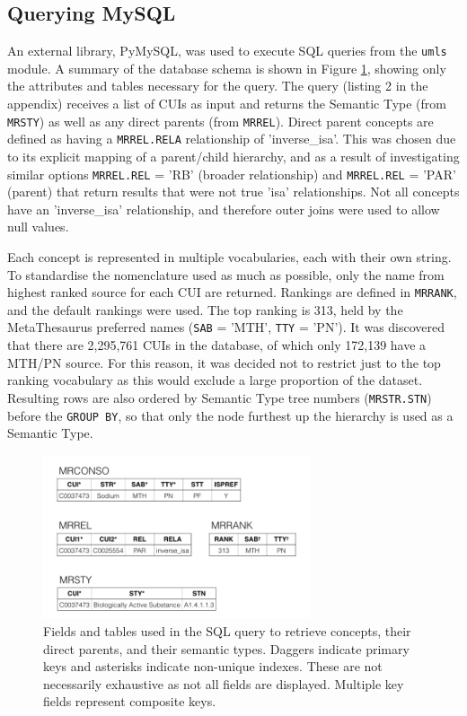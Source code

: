 \documentclass[Report.tex]{subfiles}
\begin{document}
\subsection{Querying MySQL}
An external library, PyMySQL, was used to execute SQL queries from the \texttt{umls} module. A summary of the database schema is shown in Figure \ref{fig:db}, showing only the attributes and tables necessary for the query. The query (listing 2 in the appendix) receives a list of CUIs as input and returns the Semantic Type (from \texttt{MRSTY}) as well as any direct parents (from \texttt{MRREL}). Direct parent concepts are defined as having a \texttt{MRREL.RELA} relationship of 'inverse\_isa'. This was chosen due to its explicit mapping of a parent/child hierarchy, and as a result of investigating similar options \texttt{MRREL.REL} = 'RB' (broader relationship) and \texttt{MRREL.REL} = 'PAR' (parent) that return results that were not true 'isa' relationships. Not all concepts have an 'inverse\_isa' relationship, and therefore outer joins were used to allow null values.\newline

\noindent Each concept is represented in multiple vocabularies, each with their own string. To standardise the nomenclature used as much as possible, only the name from highest ranked source for each CUI are returned. Rankings are defined in \texttt{MRRANK}, and the default rankings were used. The top ranking is 313, held by the MetaThesaurus preferred names (\texttt{SAB} = 'MTH', \texttt{TTY} = 'PN'). It was discovered that there are 2,295,761 CUIs in the database, of which only 172,139 have a MTH/PN source. For this reason, it was decided not to restrict just to the top ranking vocabulary as this would exclude a large proportion of the dataset. Resulting rows are also ordered by Semantic Type tree numbers (\texttt{MRSTR.STN}) before the \texttt{GROUP BY}, so that only the node furthest up the hierarchy is used as a Semantic Type.

\begin{figure}[ht!]
\begin{center}
\includegraphics[width=0.7\textwidth]{../lib/images/db.png}
\caption{Fields and tables used in the SQL query to retrieve concepts, their direct parents, and their semantic types. Daggers indicate primary keys and asterisks indicate non-unique indexes. These are not necessarily exhaustive as not all fields are displayed. Multiple key fields represent composite keys. }
\label{fig:db}
\end{center}
\end{figure}
\end{document}
